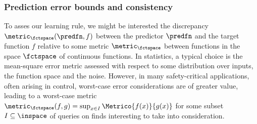 %




\subsubsection{Prediction error bounds and consistency}

To asses our learning rule, we might be interested the discrepancy $\metric_\fctspace(\predfn,f)$ between the predictor $\predfn$ and the target function $f$ relative to some metric $\metric_{\fctspace}$ between functions in the space $\fctspace$ of continuous functions. In statistics, a typical choice is the mean-square error metric assessed with respect to some distribution over inputs, the function space and the noise. However, in many safety-critical applications, often arising in control, worst-case error considerations are of greater value, leading to a worst-case metric 
$\metric_\fctspace(f,g) = \sup_{x \in I} \Metrico{ f(x)}{g(x)} $ for some subset $I \subseteq \inspace$ of queries on finds interesting to take into consideration. 

